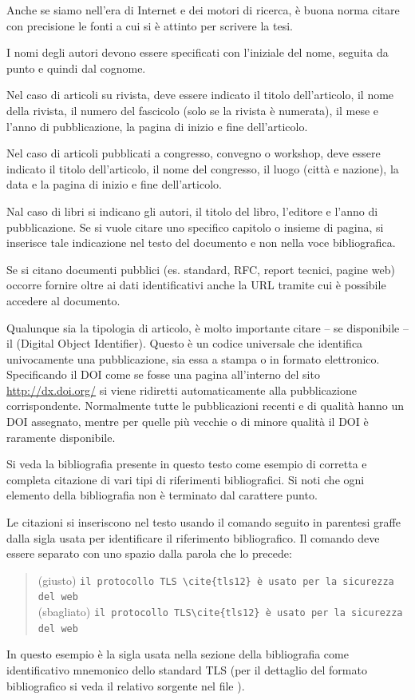 Anche se siamo nell'era di Internet e dei motori di ricerca, è buona norma citare con precisione le fonti a cui si è attinto per scrivere la tesi. 

I nomi degli autori devono essere specificati con l'iniziale del nome, seguita da punto e quindi dal cognome.

Nel caso di articoli su rivista, deve essere indicato il titolo dell'articolo, il nome della rivista, il numero del fascicolo (solo se la rivista è numerata), il mese e l'anno di pubblicazione,  la pagina di inizio e fine dell'articolo.

Nel caso di articoli pubblicati a congresso, convegno o workshop, deve essere indicato il titolo dell'articolo, il nome del congresso, il luogo (città e nazione), la data e la pagina di inizio e fine dell'articolo.

Nal caso di libri si indicano gli autori, il titolo del libro, l'editore e l'anno di pubblicazione. Se si vuole citare uno specifico capitolo o insieme di pagina, si inserisce tale indicazione nel testo del documento e non nella voce bibliografica.

Se si citano documenti pubblici (es. standard, RFC, report tecnici, pagine web) occorre fornire oltre ai dati identificativi anche la URL tramite cui è possibile accedere al documento.

Qualunque sia la tipologia di articolo, è molto importante citare -- se disponibile -- il  (Digital Object Identifier). Questo è un codice universale che identifica univocamente una pubblicazione, sia essa a stampa o in formato elettronico. Specificando il DOI come se fosse una pagina all'interno del sito \url{http://dx.doi.org/} si viene ridiretti automaticamente alla pubblicazione corrispondente. Normalmente tutte le pubblicazioni recenti e di qualità hanno un DOI assegnato, mentre per quelle più vecchie o di minore qualità il DOI è raramente disponibile.

Si veda la bibliografia presente in questo testo come esempio di corretta e completa citazione di vari tipi di riferimenti bibliografici.
Si noti che ogni elemento della bibliografia non è terminato dal carattere punto.

Le citazioni si inseriscono nel testo usando il comando  seguito in parentesi graffe dalla sigla usata per identificare il riferimento bibliografico. Il comando  deve essere separato con uno spazio dalla parola che lo precede:
\begin{quote}
(giusto) \verb+il protocollo TLS \cite{tls12} è usato per la sicurezza del web+
\\
(sbagliato) \verb+il protocollo TLS\cite{tls12} è usato per la sicurezza del web+
\end{quote}
In questo esempio  è la sigla usata nella sezione della bibliografia come identificativo mnemonico dello standard TLS (per il dettaglio del formato bibliografico si veda il relativo sorgente nel file ).

